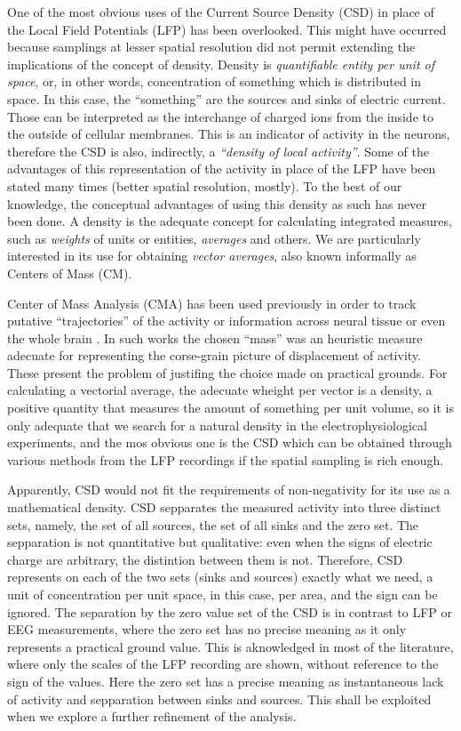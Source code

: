 \documentclass{article}
\begin{document}
One of the most obvious uses of the Current Source Density (CSD) in place of the Local Field Potentials (LFP) has been overlooked. This might have occurred because  samplings at lesser spatial resolution did not permit extending the implications of the concept of density. Density is \emph{quantifiable entity per unit of space}, or, in other words, concentration of something which is distributed in space. In this case, the ``something'' are the sources and sinks of electric current. Those can be interpreted as the interchange of charged ions from the inside to the outside of cellular membranes. This is an indicator of activity in the neurons, therefore the CSD is also, indirectly, a \emph{``density of local activity''}. Some of the advantages of this representation of the activity in place of the LFP have been stated many times (better spatial resolution, mostly). To the best of our knowledge, the conceptual advantages of using this density as such has never been done. A density is the adequate concept for calculating integrated measures, such as \emph{weights} of units or entities, \emph{averages} and others. We are particularly interested in its use for obtaining \emph{vector averages}, also known informally as Centers of Mass (CM).  


Center of Mass Analysis (CMA) has been used previously in order to track putative  ``trajectories'' of the activity or information across neural tissue or even the whole brain \cite{Chao05, Chao07, Manjarrez07, Manjarrez09}. In such works the chosen ``mass'' was an heuristic measure adecuate for representing the corse-grain picture of displacement of activity. These present the problem of justifing the choice made on practical grounds. For calculating a vectorial average, the adecuate wheight per vector is a density, a positive quantity that measures the amount of something per unit volume, so it is only adequate that we search for a natural density in the electrophysiological experiments, and the mos obvious one is the CSD which can be obtained through various methods from the LFP recordings if the spatial sampling is rich enough. 

Apparently, CSD would not fit the requirements of non-negativity for its use as a mathematical density. CSD sepparates the measured activity into three distinct sets, namely, the set of all sources, the set of all sinks and the zero set. The sepparation is not quantitative but qualitative: even when the signs of electric charge are arbitrary, the distintion between them is not. Therefore, CSD represents on each of the two sets (sinks and sources) exactly what we need, a unit of concentration per unit space, in this case, per area, and the sign can be ignored. The separation by the zero value set of the CSD is in contrast to LFP or EEG measurements, where the zero set has no precise meaning as it only represents a practical ground value. This is aknowledged in most of the literature, where only the scales of the LFP recording are shown, without reference to the sign of the values. Here the zero set has a precise meaning as instantaneous lack of activity and sepparation between sinks and sources. This shall be exploited when we explore a further refinement of the analysis.
\end{document}
